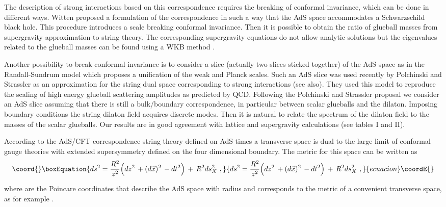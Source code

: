 \documentclass[a4paper,twocolumn,prl,groupedaddress,nofootinbib,showpacs]{revtex4}
\begin{document}
The description of strong interactions based on this correspondence  
requires the breaking of conformal invariance, which can be done 
in different ways.  
Witten \cite{Wi2} proposed a formulation of the correspondence in such 
a way that the AdS space accommodates a  Schwarzschild black hole.
This procedure introduces a scale breaking conformal invariance. 
Then it is possible to obtain the ratio of glueball masses from 
supergravity approximation to string theory.
The corresponding supergravity equations do not allow analytic 
solutions but the eigenvalues related to the glueball masses 
can be found using a WKB method \cite{MASSG}. 


Another possibility to break conformal invariance is to consider 
a slice (actually two slices sticked together) of the AdS space 
as in the Randall-Sundrum model\cite{RS1,RS2} which proposes a 
unification of the weak and Planck scales.
Such an AdS slice was used recently by Polchinski and Strassler
\cite{PS} as an approximation for the string dual space corresponding to 
strong interactions (see also\cite{GI,BB3,BT,AN}).
They used this model to reproduce the scaling  of high energy glueball 
scattering amplitudes as predicted by QCD\cite{QCD1,BRO}. 
Following the Polchinski and Strassler proposal we consider an AdS slice 
assuming that there is still a bulk/boundary correspondence, 
in particular between scalar glueballs and the dilaton.
Imposing boundary conditions the string dilaton field acquires 
discrete modes. 
Then it is natural to relate the spectrum of the dilaton field to the 
masses  of the scalar glueballs. Our results are in good agreement with
lattice and supergravity calculations (see tables I and II).

  
According to the AdS/CFT correspondence string theory defined on 
AdS\coordHE{}  times a transverse space \coordHE{} is dual to the large \coordHE{} limit 
of  \coordHE{} conformal gauge theories with extended supersymmetry defined on 
the four dimensional boundary. The metric for this space can be written as
\begin{equation}\coord{}\boxEquation{
\label{metric}
ds^2=\frac {R^2 }{ z^2}\Big( dz^2 \,+(d\vec x)^2\,
- dt^2 \Big) \,+ \,R^2 ds^2_X \,\,,
 }{
ds^2=\frac {R^2 }{ z^2}\Big( dz^2 \,+(d\vec x)^2\,
- dt^2 \Big) \,+ \,R^2 ds^2_X \,\,,
 }{ecuacion}\coordE{}\end{equation}
 
\noindent where \coordHE{} are the Poincare coordinates that 
describe the AdS space with radius \coordHE{} and \coordHE{} corresponds to 
the metric of a convenient transverse space, as for example \coordHE{}.  
\end{document}
